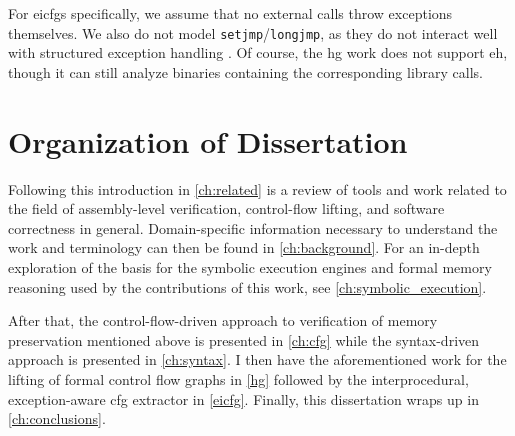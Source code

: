 For \acp{eicfg} specifically, we assume that no external calls throw exceptions themselves.
We also do not model \lstinline|setjmp|/\lstinline|longjmp|, as they do not interact well with structured exception handling \autocite{using-setjmp-and-longjmp}.
Of course, the \ac{hg} work does not support \ac{eh}, though it can still analyze binaries containing the corresponding library calls.

\begin{comment}
  Hiding for now as Dr.~Ravindran agreed this is kind of redundant with the contributions. Will discuss more with Freek.
  \section{Impact}
  \todo{What are the results? What can these contributions be used for? Seems kind of redundant with the contributions subsection though.}

  \subsection{Memory Preservation}

  \subsection{Control Flow Recovery}
\end{comment}

\section{Organization of Dissertation}
Following this introduction in \cref{ch:related} is a review of tools and work related to the field of assembly-level verification, control-flow lifting, and software correctness in general.
Domain-specific information necessary to understand the work and terminology can then be found in \cref{ch:background}.
For an in-depth exploration of the basis for the symbolic execution engines and formal memory reasoning used by the contributions of this work,
see \cref{ch:symbolic_execution}.

After that, the control-flow-driven approach to verification of memory preservation mentioned above is presented in \cref{ch:cfg} while the syntax-driven approach is presented in \cref{ch:syntax}.
I then have the aforementioned work for the lifting of formal control flow graphs in \cref{hg}
followed by the interprocedural, exception-aware \ac{cfg} extractor in \cref{eicfg}.
Finally, this dissertation wraps up in \cref{ch:conclusions}.





